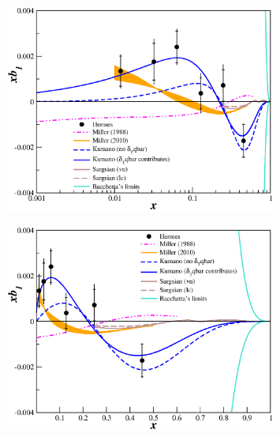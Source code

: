 \pagestyle{empty}




\begin{figure}
\begin{center}
\includegraphics[angle=0.0,width=0.8\textwidth]{xb1_mstw_newmiller.eps}
\end{center}
\end{figure}

\begin{figure}
\begin{center}
\includegraphics[angle=0.0,width=0.8\textwidth]{xb1_mstw_newmiller_lin.eps}
\end{center}
\end{figure}








